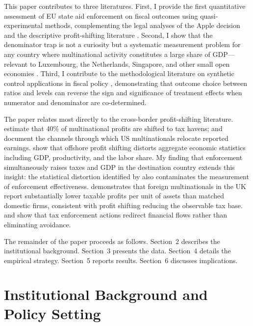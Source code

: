 \documentclass[12pt]{article}
\begin{document}
This paper contributes to three literatures. First, I provide the first quantitative assessment of EU state aid enforcement on fiscal outcomes using quasi-experimental methods, complementing the legal analyses of the Apple decision \citep{coffill2018apple, lampreave2011apple} and the descriptive profit-shifting literature \citep{torslov2023missing, dharmapala2014base, heckemeyer2017multinational}. Second, I show that the denominator trap is not a curiosity but a systematic measurement problem for any country where multinational activity constitutes a large share of GDP---relevant to Luxembourg, the Netherlands, Singapore, and other small open economies \citep{dharmapala2008corporate, garcia2021multinational}. Third, I contribute to the methodological literature on synthetic control applications in fiscal policy \citep{abadie2021penalized}, demonstrating that outcome choice between ratios and levels can reverse the sign and significance of treatment effects when numerator and denominator are co-determined.

The paper relates most directly to the cross-border profit-shifting literature. \citet{torslov2023missing} estimate that 40\% of multinational profits are shifted to tax havens; \citet{dowd2017profit} and \citet{clausing2016effect} document the channels through which US multinationals relocate reported earnings. \citet{guvenen2022offshore} show that offshore profit shifting distorts aggregate economic statistics including GDP, productivity, and the labor share. My finding that enforcement simultaneously raises taxes and GDP in the destination country extends this insight: the statistical distortion identified by \citet{guvenen2022offshore} also contaminates the measurement of enforcement effectiveness. \citet{bilicka2019comparing} demonstrates that foreign multinationals in the UK report substantially lower taxable profits per unit of assets than matched domestic firms, consistent with profit shifting reducing the observable tax base. \citet{johannesen2014tax} and \citet{johannesen2020offshore} show that tax enforcement actions redirect financial flows rather than eliminating avoidance.

The remainder of the paper proceeds as follows. Section~2 describes the institutional background. Section~3 presents the data. Section~4 details the empirical strategy. Section~5 reports results. Section~6 discusses implications.

\section{Institutional Background and Policy Setting}
\end{document}
